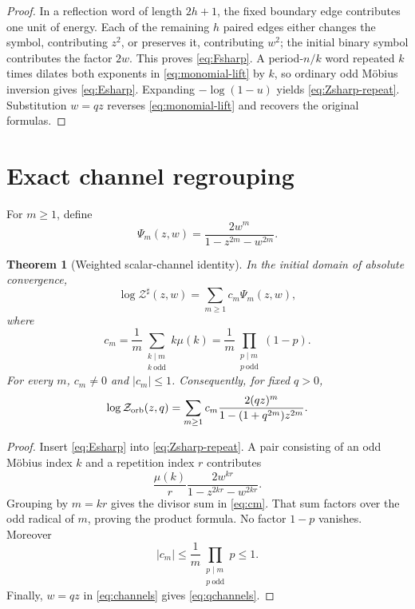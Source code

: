 \documentclass[11pt]{article}
\newtheorem{theorem}{Theorem}[section]
\newcommand{\Zorb}{\mathcal Z_{\rm orb}}
\newcommand{\Zsharp}{\mathcal Z^{\sharp}}
\newcommand{\Ps}{\Psi}
\begin{document}
\begin{proof}
In a reflection word of length $2h+1$, the fixed boundary edge contributes
one unit of energy.  Each of the remaining $h$ paired edges either changes
the symbol, contributing $z^2$, or preserves it, contributing $w^2$; the
initial binary symbol contributes the factor $2w$.  This proves
\eqref{eq:Fsharp}.  A period-$n/k$ word repeated $k$ times dilates both
exponents in \eqref{eq:monomial-lift} by $k$, so ordinary odd M\"obius
inversion gives \eqref{eq:Esharp}.  Expanding $-\log(1-u)$ yields
\eqref{eq:Zsharp-repeat}.  Substitution $w=qz$ reverses
\eqref{eq:monomial-lift} and recovers the original formulas.
\end{proof}

\section{Exact channel regrouping}

For $m\ge1$, define
\begin{equation}\label{eq:Psi}
 \Ps_m(z,w)=\frac{2w^m}{1-z^{2m}-w^{2m}}.
\end{equation}

\begin{theorem}[Weighted scalar-channel identity]\label{thm:channels}
In the initial domain of absolute convergence,
\begin{equation}\label{eq:channels}
 \log\Zsharp(z,w)=\sum_{m\ge1}c_m\Ps_m(z,w),
\end{equation}
where
\begin{equation}\label{eq:cm}
 c_m=\frac1m\sum_{\substack{k\mid m\\k\ \mathrm{odd}}}k\mu(k)
 =\frac1m\prod_{\substack{p\mid m\\p\ \mathrm{odd}}}(1-p).
\end{equation}
For every $m$, $c_m\ne0$ and $|c_m|\le1$.  Consequently, for fixed $q>0$,
\begin{equation}\label{eq:qchannels}
 \log\Zorb(z,q)=\sum_{m\ge1}c_m
 \frac{2(qz)^m}{1-(1+q^{2m})z^{2m}}.
\end{equation}
\end{theorem}

\begin{proof}
Insert \eqref{eq:Esharp} into \eqref{eq:Zsharp-repeat}.  A pair consisting
of an odd M\"obius index $k$ and a repetition index $r$ contributes
\[
 \frac{\mu(k)}r\frac{2w^{kr}}
 {1-z^{2kr}-w^{2kr}}.
\]
Grouping by $m=kr$ gives the divisor sum in \eqref{eq:cm}.  That sum factors
over the odd radical of $m$, proving the product formula.  No factor $1-p$
vanishes.  Moreover
\[
 |c_m|\le \frac1m\prod_{\substack{p\mid m\\p\ \mathrm{odd}}}p\le1.
\]
Finally, $w=qz$ in \eqref{eq:channels} gives \eqref{eq:qchannels}.
\end{proof}
\end{document}
